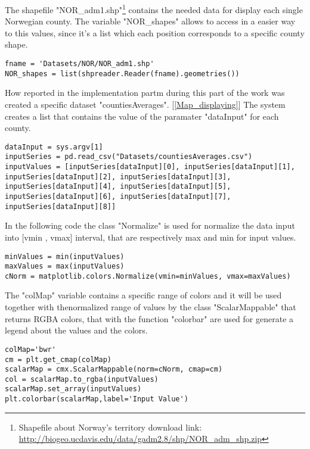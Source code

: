 The shapefile "NOR\_adm1.shp"\footnote{Shapefile about Norway's territory download link: \\ \url{http://biogeo.ucdavis.edu/data/gadm2.8/shp/NOR\_adm\_shp.zip}} contains the needed data for display each single Norwegian county. The variable "NOR\_shapes" allows to access in a easier way to this values, since it's a list which each position corresponds to a specific county shape.
\begin{lstlisting}
fname = 'Datasets/NOR/NOR_adm1.shp'
NOR_shapes = list(shpreader.Reader(fname).geometries())
\end{lstlisting}

How reported in the implementation partm during this part of the work was created a specific dataset "countiesAverages". [\ref{Map_displaying}] The system creates a list that contains the value of the paramater "dataInput" for each county.
\begin{lstlisting}
dataInput = sys.argv[1]
inputSeries = pd.read_csv("Datasets/countiesAverages.csv")
inputValues = [inputSeries[dataInput][0], inputSeries[dataInput][1], inputSeries[dataInput][2], inputSeries[dataInput][3], inputSeries[dataInput][4], inputSeries[dataInput][5], inputSeries[dataInput][6], inputSeries[dataInput][7], inputSeries[dataInput][8]]
\end{lstlisting}

In the following code the class "Normalize" is used for normalize the data input into [vmin , vmax] interval, that are respectively max and min for input values. 
\begin{lstlisting}
minValues = min(inputValues)
maxValues = max(inputValues)
cNorm = matplotlib.colors.Normalize(vmin=minValues, vmax=maxValues)
\end{lstlisting}

\newpage

The "colMap" variable contains a specific range of colors and it will be used together with thenormalized range of values by the class "ScalarMappable" that returns RGBA colors, that with the function "colorbar" are used for generate a legend about the values and the colors.
\begin{lstlisting}
colMap='bwr'
cm = plt.get_cmap(colMap)
scalarMap = cmx.ScalarMappable(norm=cNorm, cmap=cm)	
col = scalarMap.to_rgba(inputValues)	
scalarMap.set_array(inputValues)
plt.colorbar(scalarMap,label='Input Value')
\end{lstlisting}


